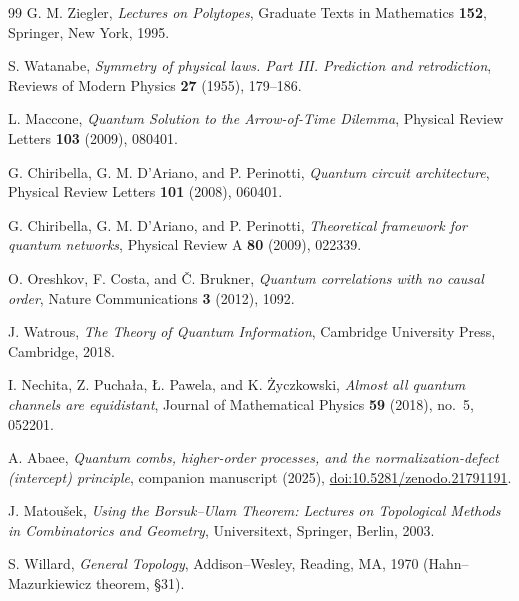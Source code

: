 \documentclass[11pt]{article}
\begin{document}
\begin{thebibliography}{99}
G. M. Ziegler, \emph{Lectures on Polytopes}, Graduate Texts in Mathematics
\textbf{152}, Springer, New York, 1995.

S. Watanabe, \emph{Symmetry of physical laws. Part III. Prediction and
retrodiction}, Reviews of Modern Physics \textbf{27} (1955), 179--186.

L. Maccone, \emph{Quantum Solution to the Arrow-of-Time Dilemma},
Physical Review Letters \textbf{103} (2009), 080401.

G. Chiribella, G. M. D'Ariano, and P. Perinotti, \emph{Quantum circuit
architecture}, Physical Review Letters \textbf{101} (2008), 060401.

G. Chiribella, G. M. D'Ariano, and P. Perinotti, \emph{Theoretical
framework for quantum networks}, Physical Review A \textbf{80} (2009),
022339.

O. Oreshkov, F. Costa, and \v{C}. Brukner, \emph{Quantum correlations with
no causal order}, Nature Communications \textbf{3} (2012), 1092.

J. Watrous, \emph{The Theory of Quantum Information}, Cambridge University
Press, Cambridge, 2018.

I. Nechita, Z. Pucha\l{}a, \L{}. Pawela, and K. \.Zyczkowski, \emph{Almost all
quantum channels are equidistant}, Journal of Mathematical Physics \textbf{59}
(2018), no.~5, 052201.

A. Abaee, \emph{Quantum combs, higher-order processes, and the
normalization-defect (intercept) principle}, companion manuscript (2025),
\href{https://doi.org/10.5281/zenodo.21791191}{doi:10.5281/zenodo.21791191}.

J. Matou\v{s}ek, \emph{Using the Borsuk--Ulam Theorem: Lectures on Topological
Methods in Combinatorics and Geometry}, Universitext, Springer, Berlin, 2003.

S. Willard, \emph{General Topology}, Addison--Wesley, Reading, MA, 1970
(Hahn--Mazurkiewicz theorem, \S31).

\end{thebibliography}
\end{document}
